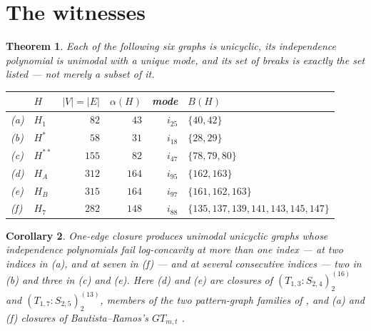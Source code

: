 \documentclass[11pt]{amsart}
\newtheorem{theorem}{Theorem}
\newtheorem{corollary}[theorem]{Corollary}
\theoremstyle{definition}
\theoremstyle{remark}
\newcommand{\albr}{\alpha}
\begin{document}
\section{The witnesses}

\begin{theorem}\label{thm:main}
Each of the following six graphs is unicyclic, its independence polynomial is
unimodal with a unique mode, and its set of breaks is \emph{exactly} the set listed
--- not merely a subset of it.

\begin{center}
\renewcommand{\arraystretch}{1.15}
\begin{tabular}{llrrrl}
 & $H$ & $|V|=|E|$ & $\albr(H)$ & mode & $B(H)$\\
\hline
\textup{(a)} & $H_1$      & $82$  & $43$  & $i_{25}$ & $\{40,42\}$\\
\textup{(b)} & $H^*$      & $58$  & $31$  & $i_{18}$ & $\{28,29\}$\\
\textup{(c)} & $H^{**}$   & $155$ & $82$  & $i_{47}$ & $\{78,79,80\}$\\
\textup{(d)} & $H_A$      & $312$ & $164$ & $i_{95}$ & $\{162,163\}$\\
\textup{(e)} & $H_B$      & $315$ & $164$ & $i_{97}$ & $\{161,162,163\}$\\
\textup{(f)} & $H_7$      & $282$ & $148$ & $i_{88}$ & $\{135,137,139,141,143,145,147\}$
\end{tabular}
\end{center}
\end{theorem}

\begin{corollary}\label{cor:answer}
One-edge closure produces unimodal unicyclic graphs whose independence polynomials
fail log-concavity at more than one index --- at two indices in \textup{(a)}, and at
seven in \textup{(f)} --- and at several \emph{consecutive} indices --- two in
\textup{(b)} and three in \textup{(c)} and \textup{(e)}. Here \textup{(d)} and
\textup{(e)} are closures of $(T_{1,3}:S_{2,4})_2^{(16)}$ and
$(T_{1,7}:S_{2,5})_2^{(13)}$, members of the two pattern-graph families of
\textup{\cite{BRGG}}, and \textup{(a)} and \textup{(f)} closures of
Bautista--Ramos's $GT_{m,t}$ \textup{\cite{BautistaRamos}}.
\end{corollary}
\end{document}
